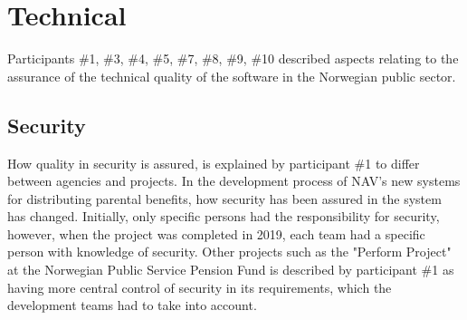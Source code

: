 





\section{Technical} \label{sec:technical}
Participants \#1, \#3, \#4, \#5, \#7, \#8, \#9, \#10 described aspects relating to the assurance of the technical quality of the software in the Norwegian public sector. 

\subsection{Security} \label{sec:security}
How quality in security is assured, is explained by participant \#1 to differ between agencies and projects. In the development process of NAV's new systems for distributing parental benefits, how security has been assured in the system has changed. Initially, only specific persons had the responsibility for security, however, when the project was completed in 2019, each team had a specific person with knowledge of security. Other projects such as the "Perform Project" at the Norwegian Public Service Pension Fund is described by participant \#1 as having more central control of security in its requirements, which the development teams had to take into account.

